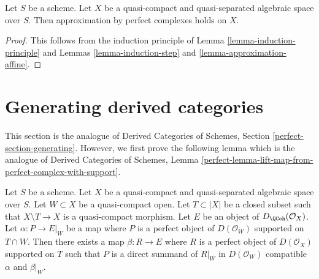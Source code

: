 \begin{theorem}
\label{theorem-approximation}
Let $S$ be a scheme.
Let $X$ be a quasi-compact and quasi-separated algebraic space over $S$.
Then approximation by perfect complexes holds on $X$.
\end{theorem}

\begin{proof}
This follows from the induction principle of
Lemma \ref{lemma-induction-principle}
and Lemmas \ref{lemma-induction-step} and \ref{lemma-approximation-affine}.
\end{proof}






\section{Generating derived categories}
\label{section-generating}

\noindent
This section is the analogue of
Derived Categories of Schemes, Section \ref{perfect-section-generating}.
However, we first prove the following lemma which is the
analogue of Derived Categories of Schemes, Lemma
\ref{perfect-lemma-lift-map-from-perfect-complex-with-support}.

\begin{lemma}
\label{lemma-lift-map-from-perfect-complex-with-support}
Let $S$ be a scheme. Let $X$ be a quasi-compact and quasi-separated
algebraic space over $S$. Let $W \subset X$ be a quasi-compact open.
Let $T \subset |X|$ be a closed subset such that
$X \setminus T \to X$ is a quasi-compact morphism.
Let $E$ be an object of $D_\QCoh(\mathcal{O}_X)$.
Let $\alpha : P \to E|_W$ be a map where $P$ is a perfect object of
$D(\mathcal{O}_W)$ supported on $T \cap W$. Then there exists a map
$\beta : R \to E$ where $R$ is a perfect object of $D(\mathcal{O}_X)$
supported on $T$ such that $P$ is a direct summand of $R|_W$ in
$D(\mathcal{O}_W)$ compatible $\alpha$ and $\beta|_W$.
\end{lemma}

